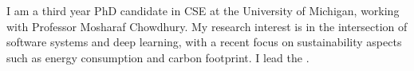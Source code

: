 

\begin{cvparagraph}

I am a third year PhD candidate in CSE at the University of Michigan, working with Professor Mosharaf Chowdhury.
My research interest is in the intersection of software systems and deep learning, with a recent focus on sustainability aspects such as energy consumption and carbon footprint.
I lead the \href{https://ml.energy}{}.
\end{cvparagraph}
